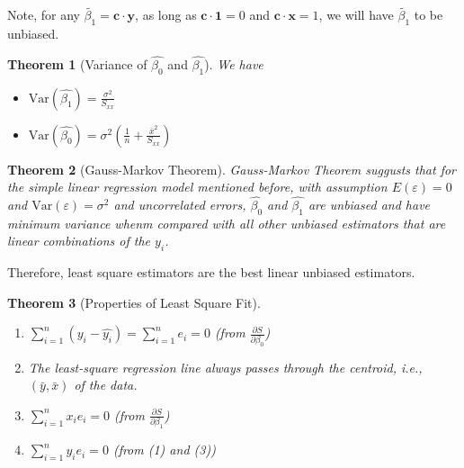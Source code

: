 \documentclass[11pt]{article}
\newcommand{\var}{\mathrm{Var}}
\newtheorem{theorem}{Theorem}[section]
\theoremstyle{definition}
\begin{document}
Note, for any $\tilde{\beta_1}= \mathbf{c}\cdot\mathbf{y}$, as long as $\mathbf{c}\cdot \mathbf{1} = 0$ and $\mathbf{c}\cdot \mathbf{x} = 1$, we will have $\tilde{\beta_1}$ to be unbiased.
\begin{theorem}[Variance of {$\hat{\beta_0}$} and {$\hat{\beta_1}$}]
\normalfont 
We have
\begin{itemize}
  \item $\var(\hat{\beta_1}) = \frac{\sigma^2}{S_{xx}}$
  \item $\var(\hat{\beta_0}) = \sigma^2\left(\frac{1}{n}+\frac{\bar{x}^2}{S_{xx}}\right)$
\end{itemize}
\end{theorem}
\begin{theorem}[Gauss-Markov Theorem]
\normalfont Gauss-Markov Theorem suggusts that for the simple linear regression model mentioned before, with assumption $E(\varepsilon) = 0$ and $\var(\varepsilon) = \sigma^2$ and uncorrelated errors, $\hat{\beta_0}$ and $\hat{\beta_1}$ are unbiased and have minimum variance whenm compared with all other unbiased estimators that are linear combinations of the $y_i$.
\end{theorem}
Therefore, least square estimators are the best linear unbiased estimators.
\begin{theorem}[Properties of Least Square Fit]
\hfill\\
\normalfont \begin{enumerate}
\item $\sum_{i=1}^n (y_i-\hat{y_i}) =\sum_{i=1}^n e_i = 0$ (from $\frac{\partial S}{\partial \beta_0}$)
\item The least-square regression line always passes through the centroid, i.e., $(\bar{y}, \bar{x})$ of the data.
\item $\sum_{i=1}^n x_ie_i = 0$ (from $\frac{\partial S}{\partial \beta_1}$)
\item $\sum_{i=1}^n \hat{y_i}e_i = 0$ (from (1) and (3))
\end{enumerate}
\end{theorem}
\end{document}
